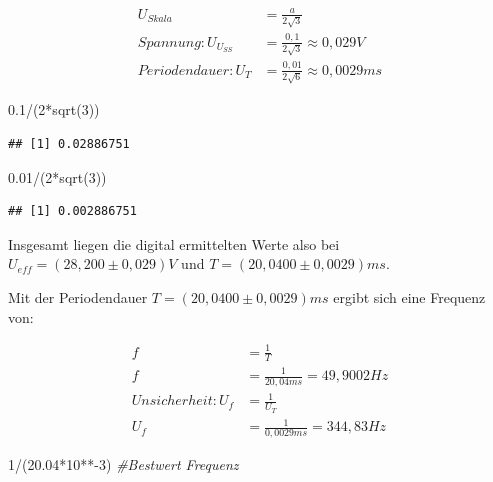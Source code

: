 \documentclass[
  9pt,
]{article}
\newenvironment{Shaded}{\begin{snugshade}}{\end{snugshade}}
\newcommand{\CommentTok}[1]{\textcolor[rgb]{0.56,0.35,0.01}{\textit{#1}}}
\newcommand{\DecValTok}[1]{\textcolor[rgb]{0.00,0.00,0.81}{#1}}
\newcommand{\FloatTok}[1]{\textcolor[rgb]{0.00,0.00,0.81}{#1}}
\newcommand{\FunctionTok}[1]{\textcolor[rgb]{0.00,0.00,0.00}{#1}}
\newcommand{\NormalTok}[1]{#1}
\newcommand{\SpecialCharTok}[1]{\textcolor[rgb]{0.00,0.00,0.00}{#1}}
\begin{document}
\begin{equation*}
\begin{split}
U_{Skala} &= \frac{a}{2\sqrt{3}} \\
Spannung: U_{U_{SS}} &= \frac{0,1}{2\sqrt{3}} \approx 0,029V \\
Periodendauer: U_T &= \frac{0,01}{2\sqrt{6}} \approx 0,0029ms 
\end{split}
\end{equation*}

\begin{Shaded}
\begin{Highlighting}[]
\FloatTok{0.1}\SpecialCharTok{/}\NormalTok{(}\DecValTok{2}\SpecialCharTok{*}\FunctionTok{sqrt}\NormalTok{(}\DecValTok{3}\NormalTok{)) }
\end{Highlighting}
\end{Shaded}

\begin{verbatim}
## [1] 0.02886751
\end{verbatim}

\begin{Shaded}
\begin{Highlighting}[]
\FloatTok{0.01}\SpecialCharTok{/}\NormalTok{(}\DecValTok{2}\SpecialCharTok{*}\FunctionTok{sqrt}\NormalTok{(}\DecValTok{3}\NormalTok{)) }
\end{Highlighting}
\end{Shaded}

\begin{verbatim}
## [1] 0.002886751
\end{verbatim}

Insgesamt liegen die digital ermittelten Werte also bei
\(U_{eff} = (28,200 \pm 0,029) V\) und \(T = (20,0400 \pm 0,0029) ms\).

Mit der Periodendauer \(T = (20,0400 \pm 0,0029) ms\) ergibt sich eine
Frequenz von:

\begin{equation*}
\begin{split}
f &= \frac{1}{T} \\
f &= \frac{1}{20,04ms} = 49,9002 Hz \\
Unsicherheit: U_f &= \frac{1}{U_T} \\
U_f &= \frac{1}{0,0029ms} = 344,83 Hz
\end{split}
\end{equation*}

\begin{Shaded}
\begin{Highlighting}[]
\DecValTok{1}\SpecialCharTok{/}\NormalTok{(}\FloatTok{20.04}\SpecialCharTok{*}\DecValTok{10}\SpecialCharTok{**{-}}\DecValTok{3}\NormalTok{) }\CommentTok{\#Bestwert Frequenz}
\end{Highlighting}
\end{Shaded}
\end{document}
